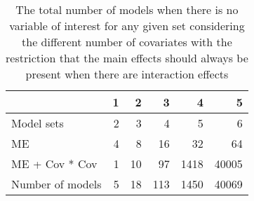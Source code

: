 \begin{table}[!h]
\centering
\caption{The total number of models when there is no variable of interest for any given set considering the different number of covariates with the restriction that the main effects should always be present when there are interaction effects} 
\begin{tabular}{lrrrrr}
  \hline
 & 1 & 2 & 3 & 4 & 5 \\ 
  \hline
Model sets & 2 & 3 & 4 & 5 & 6 \\ 
  ME & 4 & 8 & 16 & 32 & 64 \\ 
  ME + Cov * Cov & 1 & 10 & 97 & 1418 & 40005 \\ 
  Number of models & 5 & 18 & 113 & 1450 & 40069 \\ 
   \hline
\end{tabular}
\end{table}
